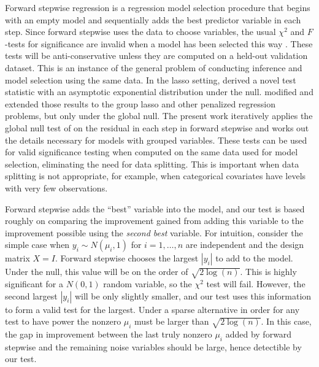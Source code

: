 \documentclass[oupdraft]{bio}
\begin{document}
Forward stepwise regression is a regression model selection procedure
that begins with an empty model and sequentially adds the best
predictor variable in each step. Since forward stepwise uses the data
to choose variables, the usual $\chi^2$ and $F$-tests for significance
are invalid when a model has been selected this way
\citep{olshen:flevel}.
These tests will
be anti-conservative unless they are computed on a held-out validation
dataset. This is an instance of the general problem of conducting
inference and model selection using the same data. In the lasso setting,
\cite{significance:lasso} derived a novel test
statistic with an asymptotic exponential distribution under the null.
\cite{tests:adaptive} modified and extended those
results to the group lasso \citep{bakin:grouplasso,grouplasso} and other penalized regression problems, but only under the global null.
The present work iteratively applies the global null test of
\cite{tests:adaptive} on the residual in each step in forward stepwise
and works out the details necessary for models with grouped
variables.
These tests can be used for
valid significance testing when computed on the same data used for
model selection, eliminating the need for data splitting. This is
important when data splitting is not appropriate, for
example, when categorical covariates have levels with very few
observations.

Forward stepwise adds the ``best'' variable into the model, and our test is
based roughly on comparing the improvement gained from adding this variable
to the improvement possible using the {\em second best} variable.
For intuition, consider the simple case when $y_i \sim N(\mu_i,1)$
for $i = 1,\ldots,n$
are independent and the design matrix $X = I$. Forward stepwise chooses the
largest $|y_i|$ to add to the model. Under the null, this value will be
on the order of $\sqrt{2 \log (n)}$. This is highly significant for a
$N(0,1)$ random variable, so the $\chi^2$ test will fail.
However, the second largest $|y_i|$ will be only slightly smaller, and our
test uses this information to form a valid test for the largest. Under a
sparse alternative in order for any test to have power the nonzero
$\mu_i$ must be larger than $\sqrt{2 \log (n)}$. In this case, 
the gap in improvement between the last truly nonzero $\mu_i$ added by
forward stepwise and the remaining noise variables should be large,
hence detectible by our test.
\end{document}

